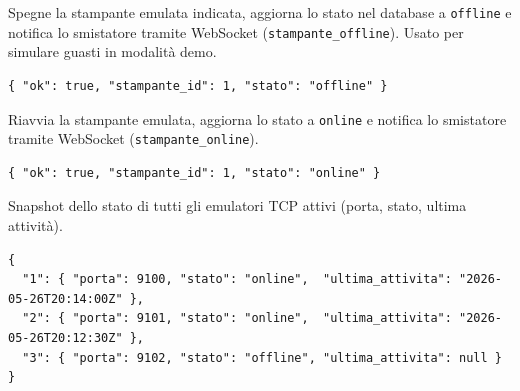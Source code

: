 
Spegne la stampante emulata indicata, aggiorna lo stato nel database a
\texttt{offline} e notifica lo smistatore tramite WebSocket
(\texttt{stampante\_offline}). Usato per simulare guasti in modalità demo.

\begin{lstlisting}[style=json]
{ "ok": true, "stampante_id": 1, "stato": "offline" }
\end{lstlisting}


Riavvia la stampante emulata, aggiorna lo stato a \texttt{online} e notifica lo
smistatore tramite WebSocket (\texttt{stampante\_online}).

\begin{lstlisting}[style=json]
{ "ok": true, "stampante_id": 1, "stato": "online" }
\end{lstlisting}


Snapshot dello stato di tutti gli emulatori TCP attivi (porta, stato, ultima
attività).

\begin{lstlisting}[style=json]
{
  "1": { "porta": 9100, "stato": "online",  "ultima_attivita": "2026-05-26T20:14:00Z" },
  "2": { "porta": 9101, "stato": "online",  "ultima_attivita": "2026-05-26T20:12:30Z" },
  "3": { "porta": 9102, "stato": "offline", "ultima_attivita": null }
}
\end{lstlisting}

\newpage